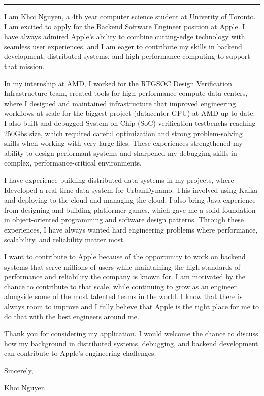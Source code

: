 \documentclass[
	12pt, %
]{resume} %
\begin{document}
    \medskip
    \hrule %
    \medskip  

I am Khoi Nguyen, a 4th year computer science student at Univerity of Toronto. I am excited to apply for the Backend Software Engineer position at Apple. I have always admired Apple’s ability to combine cutting-edge technology with seamless user experiences, and I am eager to contribute my skills in backend development, distributed systems, and high-performance computing to support that mission.

In my internship at AMD, I worked for the RTGSOC Design Verification Infrastructure team, created tools for high-performance compute data centers, where I designed and maintained infrastructure that improved engineering workflows at scale for the biggest project (datacenter GPU) at AMD up to date. I also built and debugged System-on-Chip (SoC) verification testbenchs reaching 250Gbs size, which required careful optimization and strong problem-solving skills when working with very large files. These experiences strengthened my ability to design performant systems and sharpened my debugging skills in complex, performance-critical environments.

I have experience building distributed data systems in my projects, where Ideveloped a real-time data system for UrbanDynamo. This involved using Kafka and deploying to the cloud and managing the cloud. I also bring Java experience from designing and building platformer games, which gave me a solid foundation in object-oriented programming and software design patterns. Through these experiences, I have always wanted hard engineering problems where performance, scalability, and reliability matter most.

I want to contribute to Apple because of the opportunity to work on backend systems that serve millions of users while maintaining the high standards of performance and reliability the company is known for. I am motivated by the chance to contribute to that scale, while continuing to grow as an engineer alongside some of the most talented teams in the world. I know that there is always room to improve and I fully believe that Apple is the right place for me to do that with the best engineers around me.

Thank you for considering my application. I would welcome the chance to discuss how my background in distributed systems, debugging, and backend development can contribute to Apple’s engineering challenges.

Sincerely,

Khoi Nguyen
\end{document}
